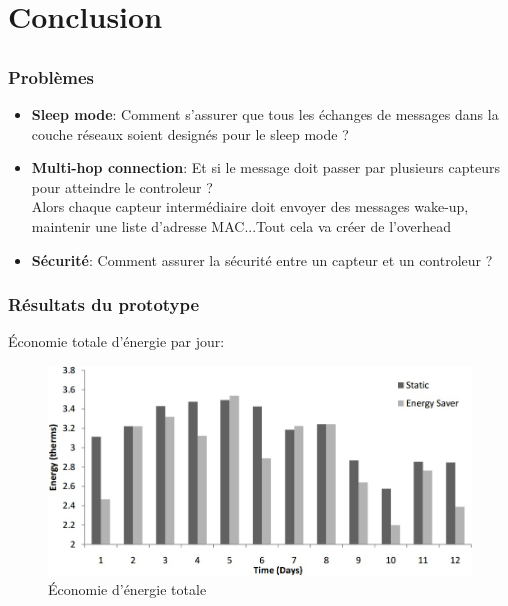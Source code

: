 \section{Conclusion}
\subsection{}

\begin{frame}
 \frametitle{Problèmes}
 \begin{itemize}
  \item \textbf{Sleep mode}: Comment s'assurer que tous les échanges de messages dans la couche réseaux soient designés pour le sleep mode ?
  \item \textbf{Multi-hop connection}: Et si le message doit passer par plusieurs capteurs pour atteindre le controleur ?\\
  Alors chaque capteur intermédiaire doit envoyer des messages wake-up, maintenir une liste d'adresse MAC...Tout cela va créer de l'overhead
  \item \textbf{Sécurité}: Comment assurer la sécurité entre un capteur et un controleur ?\\
 \end{itemize}
\end{frame}

\begin{frame}
 \frametitle{Résultats du prototype}
 Économie totale d'énergie par jour:
 \begin{figure}
  \centering
  \includegraphics[scale=0.38]{figures/energysaver.jpg}
  \caption{Économie d'énergie totale}
 \end{figure} 
\end{frame}